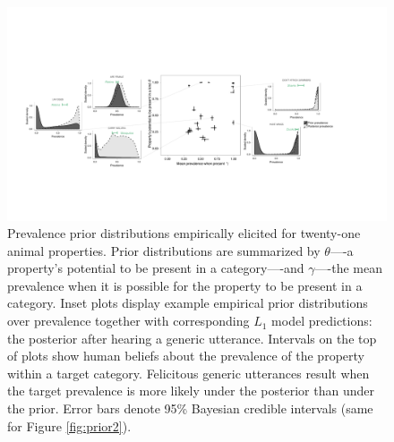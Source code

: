 \documentclass{pnastwo}
\begin{document}
\begin{article}
%
\begin{figure}
\centering
    \includegraphics[width=1.8\columnwidth]{prevalence-scatter-wDists_wide.pdf}
    \caption{Prevalence prior distributions empirically elicited for twenty-one animal properties.
    Prior distributions are summarized by $\theta$----a property's potential to be present in a category----and $\gamma$----the mean prevalence when it is possible for the property to be present in a category.
    Inset plots display example empirical prior distributions over prevalence together with corresponding $L_1$ model predictions: the posterior after hearing a generic utterance. 
    Intervals on the top of plots show human beliefs about the prevalence of the property within a target category.
    Felicitous generic utterances result when the target prevalence is more likely under the posterior than under the prior.
     Error bars denote 95\% Bayesian credible intervals (same for Figure \ref{fig:prior2}).
    }
  \label{fig:priors1a}
\end{figure}




\end{article}
\end{document}
